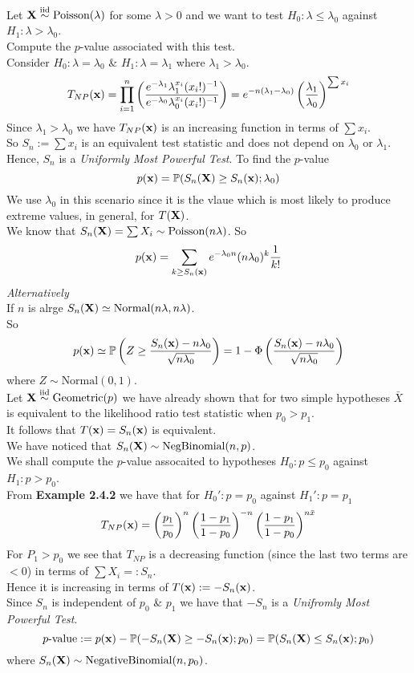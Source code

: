 \documentclass[11pt,a4paper]{article}
\begin{document}
Let $\textbf{X}\overset{\text{iid}}{\sim}\text{Poisson}(\lambda)$ for some $\lambda>0$ and we want to test $H_0:\lambda\leq\lambda_0$ against $H_1:\lambda>\lambda_0$.\\
Compute the $p$-value associated with this test.\\
Consider $H_0:\lambda=\lambda_0$ \& $H_1:\lambda=\lambda_1$ where $\lambda_1>\lambda_0$.\\
$$T_{NP}(\textbf{x})=\prod_{i=1}^n\left(\dfrac{e^{-\lambda_1}\lambda_1^{x_i}(x_i!)^{-1}}{e^{-\lambda_0}\lambda_0^{x_i}(x_i!)^{-1}}\right)=e^{-n(\lambda_1-\lambda_0)}\left(\frac{\lambda_1}{\lambda_0}\right)^{\sum x_i}$$
Since $\lambda_1>\lambda_0$ we have $T_{NP}(\textbf{x})$ is an increasing function in terms of $\sum x_i$.\\
So $S_n:=\sum x_i$ is an equivalent test statistic and does not depend on $\lambda_0$ or $\lambda_1$.\\
Hence, $S_n$ is a \textit{Uniformly Most Powerful Test}.
To find the $p$-value
$$p(\textbf{x})=\mathbb{P}(S_n(\textbf{X})\geq S_n(\textbf{x});\lambda_0)$$
We use $\lambda_0$ in this scenario since it is the vlaue which is most likely to produce extreme values, in general, for $T(\textbf{X})$.\\
We know that $S_n(\textbf{X})=\sum X_i\sim\text{Poisson}(n\lambda)$. So
$$p(\textbf{x})=\sum_{k\geq S_n(\textbf{x})}e^{-\lambda_0n}(n\lambda_0)^k\frac{1}{k!}$$
\textit{Alternatively}\\
If $n$ is alrge $S_n(\textbf{X})\simeq\text{Normal}(n\lambda,n\lambda)$.\\
So
$$p(\textbf{x})\simeq\mathbb{P}\left(Z\geq\dfrac{S_n(\textbf{x})-n\lambda_0}{\sqrt{n\lambda_0}}\right)=1-\Phi\left(\dfrac{S_n(\textbf{x})-n\lambda_0}{\sqrt{n\lambda_0}}\right)$$
where $Z\sim\text{Normal}(0,1)$.\\

Let $\textbf{X}\overset{\text{iid}}{\sim}\text{Geometric}(p)$ we have already shown that for two simple hypotheses $\bar{X}$ is equivalent to the likelihood ratio test statistic when $p_0>p_1$.\\
It follows that $T(\textbf{x})=S_n(\textbf{x})$ is equivalent.\\
We have noticed that $S_n(\textbf{X})\sim\text{NegBinomial}(n,p)$.\\
We shall compute the $p$-value assocaited to hypotheses $H_0:p\leq p_0$ against $H_1:p>p_0$.\\
From \textbf{Example 2.4.2} we have that for $H_0':p=p_0$ against $H_1':p=p_1$
$$T_{NP}(\textbf{x})=\left(\frac{p_1}{p_0}\right)^n\left(\frac{1-p_1}{1-p_0}\right)^{-n}\left(\frac{1-p_1}{1-p_0}\right)^{n\bar{x}}$$
For $P_1>p_0$ we see that $T_{NP}$ is a decreasing function (since the last two terms are $<0$) in terms of $\sum X_i=:S_n$.\\
Hence it is increasing in terms of $T(\textbf{x}):=-S_n(\textbf{x})$.\\
Since $S_n$ is independent of $p_0$ \& $p_1$ we have that $-S_n$ is a \textit{Unifromly Most Powerful Test}.
$$p\text{-value}:=p(\textbf{x})-\mathbb{P}(-S_n(\textbf{X})\geq-S_n(\textbf{x});p_0)=\mathbb{P}(S_n(\textbf{X})\leq S_n(\textbf{x});p_0)$$
where $S_n(\textbf{X})\sim\text{NegativeBinomial}(n,p_0)$.\\
\end{document}
